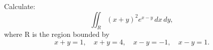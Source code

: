 Calculate:
\[
\iint_R (x+y)^2 e^{x-y} \, dx \, dy,
\]
where R is the region bounded by
\[
x + y = 1, \quad x + y = 4, \quad x - y = -1, \quad x - y = 1.
\]

